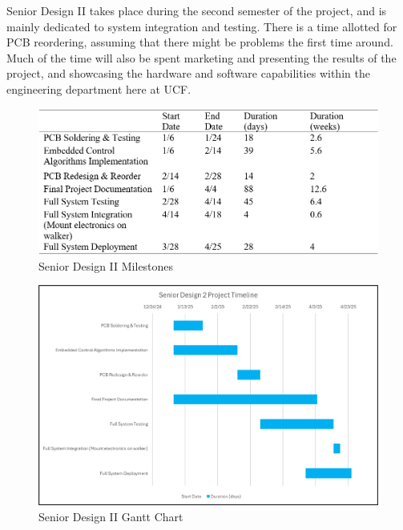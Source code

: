 \noindent Senior Design II takes place during the second semester of the project, and is mainly dedicated to system integration and testing. There is a time allotted for PCB reordering, assuming that there might be problems the first time around. Much of the time will also be spent marketing and presenting the results of the project, and showcasing the hardware and software capabilities within the engineering department here at UCF.\\

\begin{figure}[H]
	\centering
	\includegraphics[width=\textwidth]{./Images/SD2mile.png}
	\caption{\label{fig:SD2mile}Senior Design II Milestones}
\end{figure}

\begin{figure}[H]
	\centering
	\includegraphics[width=\textwidth]{./Images/SD2gantt.png}
	\caption{\label{fig:SD2gantt}Senior Design II Gantt Chart}
\end{figure}